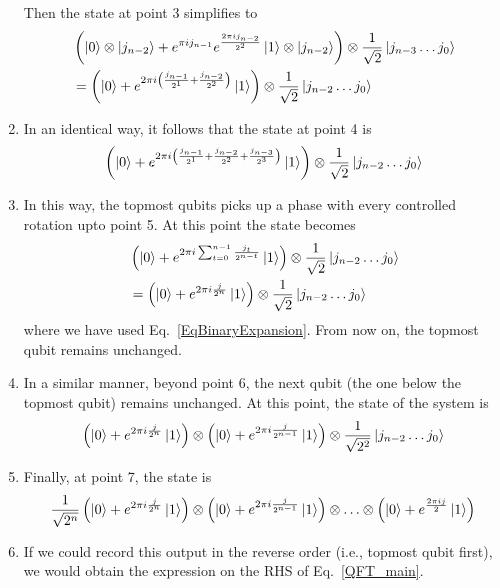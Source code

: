 \documentclass[12pt,oneside]{book}
\begin{document}
\begin{enumerate}
    Then the state at point 3 simplifies to
    \begin{align*}
       &{} \left(\ket{0}\otimes\ket{j_{n-2}}+e^{\pi i j_{n-1}}e^{\frac{2\pi i j_{n-2}}{2^2}}\ket{1}\otimes\ket{j_{n-2}}\right) \otimes \frac{1}{\sqrt{2}}\ket{j_{n-3}\hdots j_0}\\
       &{} = \left(\ket{0}+e^{2\pi i \left(\frac{j_{n-1}}{2^1}+\frac{j_{n-2}}{2^2}\right)}\ket{1}\right) \otimes \frac{1}{\sqrt{2}}\ket{j_{n-2}\hdots j_0}\\
    \end{align*}
    \item In an identical way, it follows that the state at point 4 is
    \begin{align*}
         \left(\ket{0}+e^{2\pi i \left(\frac{j_{n-1}}{2^1}+\frac{j_{n-2}}{2^2}+\frac{j_{n-3}}{2^3}\right)}\ket{1}\right) \otimes \frac{1}{\sqrt{2}}\ket{j_{n-2}\hdots j_0}
    \end{align*}
    \item In this way, the topmost qubits picks up a phase with every controlled rotation upto point 5. At this point the state becomes
    \begin{align*}
        &{}\left(\ket{0}+e^{2\pi i \sum_{t=0}^{n-1}\frac{j_t}{2^{n-t}}}\ket{1}\right) \otimes \frac{1}{\sqrt{2}}\ket{j_{n-2}\hdots j_0}\\
        &{}=\left(\ket{0}+e^{2\pi i\frac{j}{2^n}}\ket{1}\right) \otimes \frac{1}{\sqrt{2}}\ket{j_{n-2}\hdots j_0}
    \end{align*}
    where we have used Eq.~\ref{EqBinaryExpansion}.
    From now on, the topmost qubit remains unchanged.
    \item In a similar manner, beyond point 6, the next qubit (the one below the topmost qubit) remains unchanged. At this point, the state of the system is
    \begin{align*}
        \left(\ket{0}+e^{2\pi i\frac{j}{2^n}}\ket{1}\right) \otimes \left(\ket{0}+e^{2\pi i\frac{j}{2^{n-1}}}\ket{1}\right) \otimes \frac{1}{\sqrt{2^2}}\ket{j_{n-2}\hdots j_0}
    \end{align*}
\item Finally, at point 7, the state is
\begin{align*}
    \frac{1}{\sqrt{2^n}} \left(\ket{0}+e^{2\pi i\frac{j}{2^n}}\ket{1}\right) \otimes \left(\ket{0}+e^{2\pi i\frac{j}{2^{n-1}}}\ket{1}\right) \otimes \hdots \otimes \left(\ket{0} + e^{\frac{2\pi ij}{2}}\ket{1}\right)
\end{align*}
\item If we could record this output in the reverse order (i.e., topmost qubit first), we would obtain the expression on the RHS of Eq.~\ref{QFT_main}.
\end{enumerate}
\end{document}
